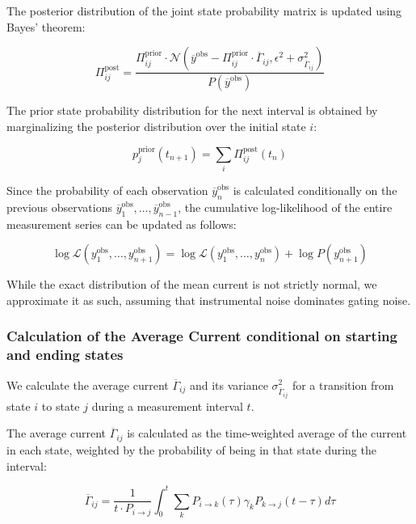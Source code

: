 \documentclass[pdflatex,sn-mathphys-num]{sn-jnl}%
\theoremstyle{thmstyleone}%
\theoremstyle{thmstyletwo}%
\theoremstyle{thmstylethree}%
\begin{document}
The posterior distribution of the joint state probability matrix is updated using Bayes' theorem:

\begin{equation}
	\Pi_{ij}^{\text{post}} = \frac{\Pi_{ij}^{\text{prior}} \cdot \mathcal{N}\left(\overline{y}^{\text{obs}} - \Pi_{ij}^{\text{prior}} \cdot \overline{\Gamma}_{ij}, \epsilon^2 + \sigma^2_{\overline{\Gamma}_{ij}}\right)}{P(\overline{y}^{\text{obs}})}
\end{equation}

The prior state probability distribution for the next interval is obtained by marginalizing the posterior distribution over the initial state $i$:

\begin{equation}
	p_j^{\text{prior}}(t_{n+1}) = \sum_i \Pi_{ij}^{\text{post}}(t_n)
\end{equation}

Since the probability of each observation $\overline{y}_n^{\text{obs}}$ is calculated conditionally on the previous observations $\overline{y}_1^{\text{obs}}, \dots, \overline{y}_{n-1}^{\text{obs}}$, the cumulative log-likelihood of the entire measurement series can be updated as follows:

\begin{equation}
	\log \mathcal{L}(y_1^{\text{obs}}, \dots, y_{n+1}^{\text{obs}}) = \log \mathcal{L}(y_1^{\text{obs}}, \dots, y_n^{\text{obs}}) + \log P(y_{n+1}^{\text{obs}})
\end{equation}



While the exact distribution of the mean current is not strictly normal, we approximate it as such, assuming that instrumental noise dominates gating noise.


\subsubsection{Calculation of the Average Current conditional on starting and ending states} 

We calculate the average current $\overline{\Gamma}_{ij}$ and its variance $\sigma^2_{\overline{\Gamma}_{ij}}$ for a transition from state $i$ to state $j$ during a measurement interval $t$.

The average current $\overline{\Gamma}_{ij}$ is calculated as the time-weighted average of the current in each state, weighted by the probability of being in that state during the interval:

\begin{equation}
	\overline{\Gamma}_{ij} = \frac{1}{t \cdot P_{i \rightarrow j}} \int_0^t \sum_k P_{i \rightarrow k}(\tau) \gamma_k P_{k \rightarrow j}(t-\tau) d\tau
\end{equation}
\end{document}
